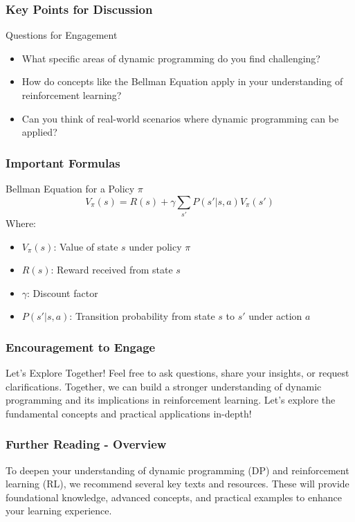 \documentclass[aspectratio=169]{beamer}
\begin{document}
\begin{frame}
  \frametitle{Key Points for Discussion}
  \begin{block}{Questions for Engagement}
    \begin{itemize}
      \item What specific areas of dynamic programming do you find challenging?
      \item How do concepts like the Bellman Equation apply in your understanding of reinforcement learning?
      \item Can you think of real-world scenarios where dynamic programming can be applied?
    \end{itemize}
  \end{block}
\end{frame}

\begin{frame}
  \frametitle{Important Formulas}
  \begin{block}{Bellman Equation for a Policy $\pi$}
    \begin{equation}
      V_{\pi}(s) = R(s) + \gamma \sum_{s'} P(s'|s, a)V_{\pi}(s')
    \end{equation}
    Where:
    \begin{itemize}
      \item $V_{\pi}(s)$: Value of state $s$ under policy $\pi$
      \item $R(s)$: Reward received from state $s$
      \item $\gamma$: Discount factor
      \item $P(s'|s, a)$: Transition probability from state $s$ to $s'$ under action $a$
    \end{itemize}
  \end{block}
\end{frame}

\begin{frame}
  \frametitle{Encouragement to Engage}
  \begin{block}{Let's Explore Together!}
    Feel free to ask questions, share your insights, or request clarifications. Together, we can build a stronger understanding of dynamic programming 
    and its implications in reinforcement learning. Let’s explore the fundamental concepts and practical applications in-depth!
  \end{block}
\end{frame}

\begin{frame}[fragile]
    \frametitle{Further Reading - Overview}
    To deepen your understanding of dynamic programming (DP) and reinforcement learning (RL), we recommend several key texts and resources. These will provide foundational knowledge, advanced concepts, and practical examples to enhance your learning experience.
\end{frame}
\end{document}
